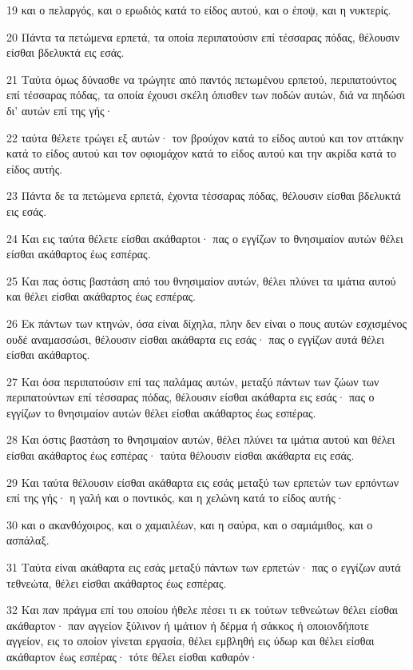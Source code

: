 \par 19 και ο πελαργός, και ο ερωδιός κατά το είδος αυτού, και ο έποψ, και η νυκτερίς.
\par 20 Πάντα τα πετώμενα ερπετά, τα οποία περιπατούσιν επί τέσσαρας πόδας, θέλουσιν είσθαι βδελυκτά εις εσάς.
\par 21 Ταύτα όμως δύνασθε να τρώγητε από παντός πετωμένου ερπετού, περιπατούντος επί τέσσαρας πόδας, τα οποία έχουσι σκέλη όπισθεν των ποδών αυτών, διά να πηδώσι δι' αυτών επί της γής·
\par 22 ταύτα θέλετε τρώγει εξ αυτών· τον βρούχον κατά το είδος αυτού και τον αττάκην κατά το είδος αυτού και τον οφιομάχον κατά το είδος αυτού και την ακρίδα κατά το είδος αυτής.
\par 23 Πάντα δε τα πετώμενα ερπετά, έχοντα τέσσαρας πόδας, θέλουσιν είσθαι βδελυκτά εις εσάς.
\par 24 Και εις ταύτα θέλετε είσθαι ακάθαρτοι· πας ο εγγίζων το θνησιμαίον αυτών θέλει είσθαι ακάθαρτος έως εσπέρας.
\par 25 Και πας όστις βαστάση από του θνησιμαίον αυτών, θέλει πλύνει τα ιμάτια αυτού και θέλει είσθαι ακάθαρτος έως εσπέρας.
\par 26 Εκ πάντων των κτηνών, όσα είναι δίχηλα, πλην δεν είναι ο πους αυτών εσχισμένος ουδέ αναμασσώσι, θέλουσιν είσθαι ακάθαρτα εις εσάς· πας ο εγγίζων αυτά θέλει είσθαι ακάθαρτος.
\par 27 Και όσα περιπατούσιν επί τας παλάμας αυτών, μεταξύ πάντων των ζώων των περιπατούντων επί τέσσαρας πόδας, θέλουσιν είσθαι ακάθαρτα εις εσάς· πας ο εγγίζων το θνησιμαίον αυτών θέλει είσθαι ακάθαρτος έως εσπέρας.
\par 28 Και όστις βαστάση το θνησιμαίον αυτών, θέλει πλύνει τα ιμάτια αυτού και θέλει είσθαι ακάθαρτος έως εσπέρας· ταύτα θέλουσιν είσθαι ακάθαρτα εις εσάς.
\par 29 Και ταύτα θέλουσιν είσθαι ακάθαρτα εις εσάς μεταξύ των ερπετών των ερπόντων επί της γής· η γαλή και ο ποντικός, και η χελώνη κατά το είδος αυτής·
\par 30 και ο ακανθόχοιρος, και ο χαμαιλέων, και η σαύρα, και ο σαμιάμιθος, και ο ασπάλαξ.
\par 31 Ταύτα είναι ακάθαρτα εις εσάς μεταξύ πάντων των ερπετών· πας ο εγγίζων αυτά τεθνεώτα, θέλει είσθαι ακάθαρτος έως εσπέρας.
\par 32 Και παν πράγμα επί του οποίου ήθελε πέσει τι εκ τούτων τεθνεώτων θέλει είσθαι ακάθαρτον· παν αγγείον ξύλινον ή ιμάτιον ή δέρμα ή σάκκος ή οποιονδήποτε αγγείον, εις το οποίον γίνεται εργασία, θέλει εμβληθή εις ύδωρ και θέλει είσθαι ακάθαρτον έως εσπέρας· τότε θέλει είσθαι καθαρόν·
